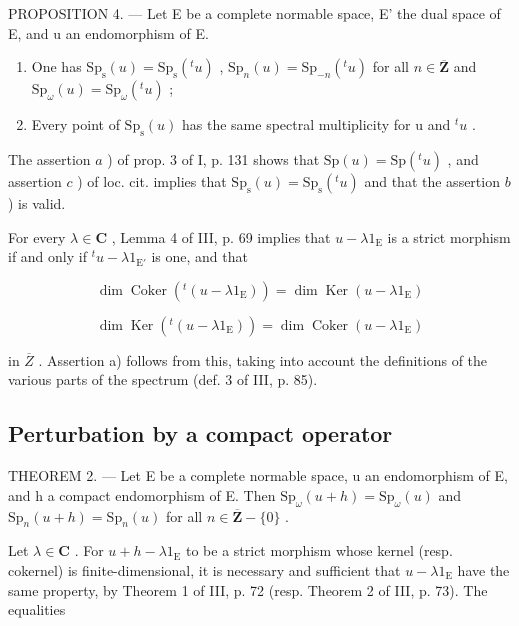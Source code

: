 PROPOSITION 4. --- Let E be a complete normable space, E' the dual space of E, and u an endomorphism of E.

\begin{enumerate}
\def\labelenumi{\alph{enumi})}
\item
  One has \(\mathrm{Sp}_{\mathrm{s}}(u) = \mathrm{Sp}_{\mathrm{s}}(^{t}u)\) , \(\mathrm{Sp}_n(u) = \mathrm{Sp}_{-n}(^t u)\) for all \(n \in \overline{\mathbf{Z}}\) and \(\mathrm{Sp}_{\omega}(u) = \mathrm{Sp}_{\omega}(^t u)\) ;
\item
  Every point of \(\mathrm{Sp}_{\mathrm{s}}(u)\) has the same spectral multiplicity for u and \({}^{t}u\) .
\end{enumerate}

The assertion \(a\) ) of prop. 3 of I, p. 131 shows that \(\mathrm{Sp}(u) = \mathrm{Sp}({}^{t}u)\) , and assertion \(c\) ) of loc. cit. implies that \(\mathrm{Sp}_{\mathrm{s}}(u) = \mathrm{Sp}_{\mathrm{s}}({}^{t}u)\) and that the assertion \(b\) ) is valid.

For every \(\lambda \in \mathbf{C}\) , Lemma 4 of III, p. 69 implies that \(u - \lambda 1_{\mathrm{E}}\) is a strict morphism if and only if \({}^{t}u - \lambda 1_{\mathrm{E}'}\) is one, and that

\[
\dim \operatorname{Coker} (^ {t} (u - \lambda 1 _ {\mathrm{E}})) = \dim \operatorname{Ker} (u - \lambda 1 _ {\mathrm{E}})
\]

\[
\dim \operatorname{Ker} (^ {t} (u - \lambda 1 _ {\mathrm{E}})) = \dim \operatorname{Coker} (u - \lambda 1 _ {\mathrm{E}})
\]

in \(\overline{Z}\) . Assertion a) follows from this, taking into account the definitions of the various parts of the spectrum (def. 3 of III, p. 85).

\subsection{Perturbation by a compact operator}

THEOREM 2. --- Let E be a complete normable space, u an endomorphism of E, and h a compact endomorphism of E. Then \(\mathrm{Sp}_{\omega}(u + h) = \mathrm{Sp}_{\omega}(u)\) and \(\mathrm{Sp}_n(u + h) = \mathrm{Sp}_n(u)\) for all \(n \in \overline{\mathbf{Z}} - \{0\}\) .

Let \(\lambda \in \mathbf{C}\) . For \(u + h - \lambda 1_{\mathrm{E}}\) to be a strict morphism whose kernel (resp. cokernel) is finite-dimensional, it is necessary and sufficient that \(u - \lambda 1_{\mathrm{E}}\) have the same property, by Theorem 1 of III, p. 72 (resp. Theorem 2 of III, p. 73). The equalities


